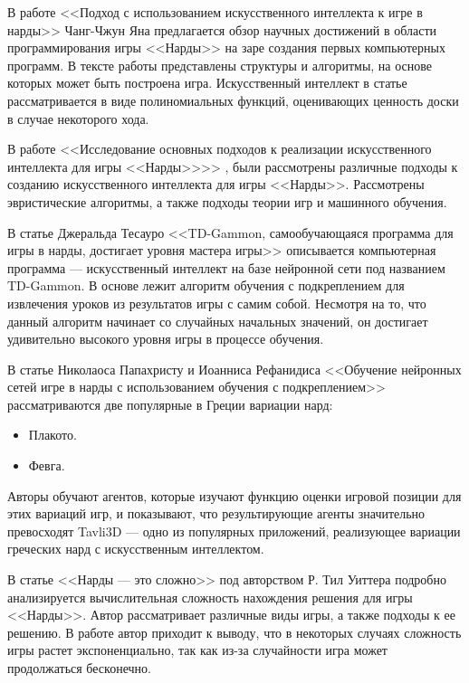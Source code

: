 В работе <<Подход с использованием искусственного интеллекта к игре в нарды>> Чанг-Чжун Яна \cite{firstattempts} предлагается обзор научных достижений в области программирования игры <<Нарды>> на заре создания первых компьютерных программ. В тексте работы представлены структуры и алгоритмы, на основе которых может быть построена игра. Искусственный интеллект в статье рассматривается в виде полиномиальных функций, оценивающих ценность доски в случае некоторого хода.

В работе <<Исследование основных подходов к реализации искусственного интеллекта для игры <<Нарды>>>> \cite{myfirstwork}, были рассмотрены различные подходы к созданию искусственного интеллекта для игры <<Нарды>>. Рассмотрены эвристические алгоритмы, а также подходы теории игр и машинного обучения.

В статье Джеральда Тесауро <<TD-Gammon, самообучающаяся программа для игры в нарды, достигает уровня мастера игры>> \cite{annotationtdgammon} описывается компьютерная программа --- искусственный интеллект на базе нейронной сети под названием TD-Gammon. В основе лежит алгоритм обучения с подкреплением для извлечения уроков из результатов игры с самим собой. Несмотря на то, что данный алгоритм начинает со случайных начальных значений, он достигает удивительно высокого уровня игры в процессе обучения.

В статье Николаоса Папахристу и Иоанниса Рефанидиса <<Обучение нейронных сетей игре в нарды с использованием обучения с подкреплением>> \cite{annotationavli3d} рассматриваются две популярные в Греции вариации нард:
\begin{itemize}
    \item Плакото.
    \item Февга.
\end{itemize}

Авторы обучают агентов, которые изучают функцию оценки игровой позиции для этих вариаций игр, и показывают, что результирующие агенты значительно превосходят Tavli3D --- одно из популярных приложений, реализующее вариации греческих нард с искусственным интеллектом.

В статье <<Нарды --- это сложно>> под авторством Р. Тил Уиттера \cite{backgammonishard} подробно анализируется вычислительная сложность нахождения решения для игры <<Нарды>>. Автор рассматривает различные виды игры, а также подходы к ее решению. В работе автор приходит к выводу, что в некоторых случаях сложность игры растет экспоненциально, так как из-за случайности игра может продолжаться бесконечно.

